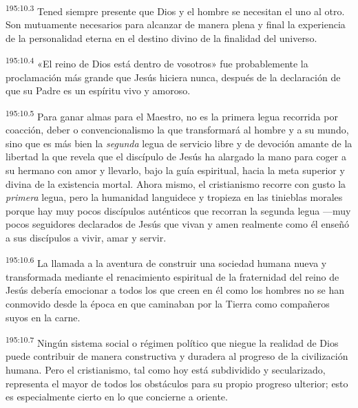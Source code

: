 \par 
\textsuperscript{195:10.3} Tened siempre presente que Dios y el hombre se necesitan el uno al otro. Son mutuamente necesarios para alcanzar de manera plena y final la experiencia de la personalidad eterna en el destino divino de la finalidad del universo.

\par 
\textsuperscript{195:10.4} «El reino de Dios está dentro de vosotros» fue probablemente la proclamación más grande que Jesús hiciera nunca, después de la declaración de que su Padre es un espíritu vivo y amoroso.

\par 
\textsuperscript{195:10.5} Para ganar almas para el Maestro, no es la primera legua recorrida por coacción, deber o convencionalismo la que transformará al hombre y a su mundo, sino que es más bien la \textit{segunda} legua de servicio libre y de devoción amante de la libertad la que revela que el discípulo de Jesús ha alargado la mano para coger a su hermano con amor y llevarlo, bajo la guía espiritual, hacia la meta superior y divina de la existencia mortal. Ahora mismo, el cristianismo recorre con gusto la \textit{primera} legua, pero la humanidad languidece y tropieza en las tinieblas morales porque hay muy pocos discípulos auténticos que recorran la segunda legua ---muy pocos seguidores declarados de Jesús que vivan y amen realmente como él enseñó a sus discípulos a vivir, amar y servir.

\par 
\textsuperscript{195:10.6} La llamada a la aventura de construir una sociedad humana nueva y transformada mediante el renacimiento espiritual de la fraternidad del reino de Jesús debería emocionar a todos los que creen en él como los hombres no se han conmovido desde la época en que caminaban por la Tierra como compañeros suyos en la carne.

\par 
\textsuperscript{195:10.7} Ningún sistema social o régimen político que niegue la realidad de Dios puede contribuir de manera constructiva y duradera al progreso de la civilización humana. Pero el cristianismo, tal como hoy está subdividido y secularizado, representa el mayor de todos los obstáculos para su propio progreso ulterior; esto es especialmente cierto en lo que concierne a oriente.

